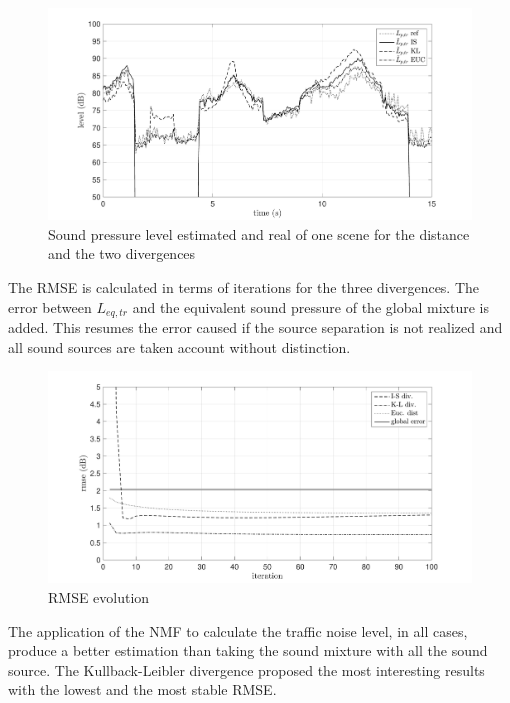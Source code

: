 \documentclass{article}
\begin{document}
\begin{sloppy}
\begin{figure}[btp]
\centering
\includegraphics[scale=0.25]{images/Lp_bvak_Sc2_It98_nbCl3.pdf}
\caption{Sound pressure level estimated and real of one scene for the distance and the two divergences}
\label{fig:Lp}
\end{figure}

The RMSE is calculated in terms of iterations for the three divergences. The error between $L_{eq,tr}$ and the equivalent sound pressure of the global mixture is added. This resumes the error caused if the source separation is not realized and all sound sources are taken account without distinction.

\begin{figure}[btp]
\centering
\includegraphics[scale=0.25]{images/comparaison_RMSE_nbCl3.pdf}
\caption{RMSE evolution}
\label{fig:rmse}
\end{figure}

The application of the NMF to calculate the traffic noise level, in all cases, produce a better estimation than taking the sound mixture with all the sound source. The Kullback-Leibler divergence proposed the most interesting results with the lowest and the most stable RMSE.



\end{sloppy}
\end{document}
